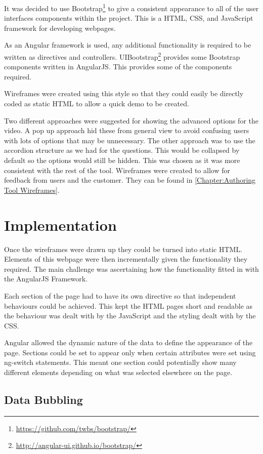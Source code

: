 It was decided to use Bootstrap\footnote{\url{https://github.com/twbs/bootstrap/}} to give a consistent appearance to all of the user interfaces components within the project. This is a HTML, \gls{CSS}, and JavaScript framework for developing webpages.

As an Angular framework is used, any additional functionality is required to be written as directives and controllers. UIBootstrap\footnote{\url{http://angular-ui.github.io/bootstrap/}} provides some Bootstrap components written in \gls{AngularJS}. This provides some of the components required. 

Wireframes were created using this style so that they could easily be directly coded as static HTML to allow a quick demo to be created. 

Two different approaches were suggested for showing the advanced options for the video. A pop up approach hid these from general view to avoid confusing users with lots of options that may be unnecessary. The other approach was to use the accordion structure as we had for the questions. This would be collapsed by default so the options would still be hidden. This was chosen as it was more consistent with the rest of the tool. Wireframes were created to allow for feedback from users and the customer. They can be found in \autoref{Chapter:Authoring Tool Wireframes}.

\section{Implementation}
\label{Section:Authoring_Implementation}
Once the wireframes were drawn up they could be turned into static HTML. Elements of this webpage were then incrementally given the functionality they required. The main challenge was ascertaining how the functionality fitted in with the \gls{AngularJS} Framework. 

Each section of the page had to have its own directive so that independent behaviours could be achieved. This kept the HTML pages short and readable as the behaviour was dealt with by the JavaScript and the styling dealt with by the \gls{CSS}.

Angular allowed the dynamic nature of the data to define the appearance of the page. Sections could be set to appear only when certain attributes were set using ng-switch statements. This meant one section could potentially show many different elements depending on what was selected elsewhere on the page.

\subsection{Data Bubbling}
\label{Section:Authoring_Data_bubbling}

